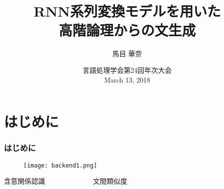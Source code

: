 \documentclass[dvipdfmx]{beamer}
\title{RNN系列変換モデルを用いた\\高階論理からの文生成}
\author[]{馬目 華奈}
\institute{お茶の水女子大学 戸次研究室}
\date{
言語処理学会第24回年次大会\\
March 13, 2018
}
\begin{document}
\begin{frame}
  \titlepage
\end{frame}


\section{はじめに}


\begin{frame}
\frametitle{はじめに}
\begin{center}
\begin{figure}[h]
	\texttt{[image: backend1.png]}
        \label{fig:backend1}
\end{figure}
\vspace{-1zh}
\begin{center}
含意関係認識　　　　　　　文間類似度\\
\small{\citep{ccg2lambda}}　　\small{\citep{yanaka2017determining}}
\end{center}
\end{center}


\end{frame}
\end{document}
